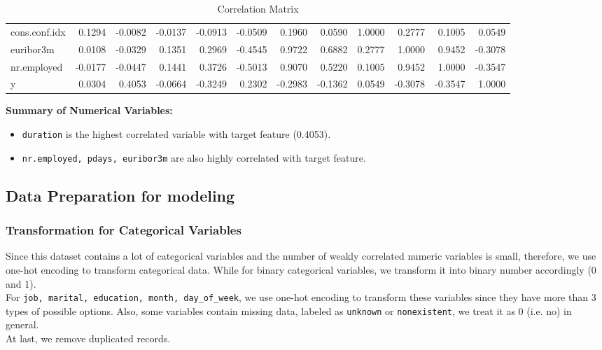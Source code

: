 \documentclass[11pt,a4paper]{article}
\begin{document}
\begin{table}[h]
{\begin{tabular}{l||rrrrrrrrrrr}
                cons.conf.idx  &  0.1294 &   -0.0082 &   -0.0137 & -0.0913 &   -0.0509 &        0.1960 &          0.0590 &         1.0000 &     0.2777 &       0.1005 &  0.0549 \\
                euribor3m      &  0.0108 &   -0.0329 &    0.1351 &  0.2969 &   -0.4545 &        0.9722 &          0.6882 &         0.2777 &     1.0000 &       0.9452 & -0.3078 \\
                nr.employed    & -0.0177 &   -0.0447 &    0.1441 &  0.3726 &   -0.5013 &        0.9070 &          0.5220 &         0.1005 &     0.9452 &       1.0000 & -0.3547 \\
                y              &  0.0304 &    0.4053 &   -0.0664 & -0.3249 &    0.2302 &       -0.2983 &         -0.1362 &         0.0549 &    -0.3078 &      -0.3547 &  1.0000 \\
            \end{tabular}
        }
        \caption{Correlation Matrix}
        \label{tab:corr_mat}
    \end{table}

    \noindent
    \textbf{Summary of Numerical Variables:}
    \begin{itemize}
        \item \texttt{duration} is the highest correlated variable with target feature (0.4053).
        \item \texttt{nr.employed, pdays, euribor3m} are also highly correlated with target feature.
    \end{itemize}
    
    
    \newpage
    \subsection{Data Preparation for modeling}
    \subsubsection{Transformation for Categorical Variables}
    Since this dataset contains a lot of categorical variables and the number of weakly correlated numeric variables is small, therefore, we use one-hot encoding to transform categorical data.  While for binary categorical variables, we transform it into binary number accordingly (0 and 1). \\
    For \texttt{job, marital, education, month, day\_of\_week}, we use one-hot encoding to transform these variables since they have more than 3 types of possible options. Also, some variables contain missing data, labeled as \texttt{unknown} or \texttt{nonexistent}, we treat it as 0 (i.e. no) in general. \\
    At last, we remove duplicated records.
    
\end{document}
